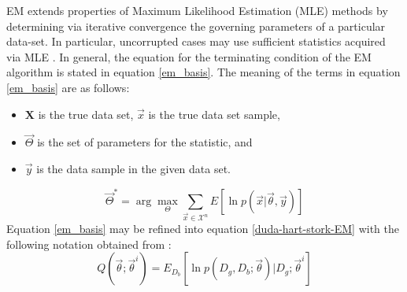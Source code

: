\documentclass[11pt]{article}
\begin{document}
EM extends properties of Maximum Likelihood Estimation (MLE) methods by determining via iterative convergence %
the governing parameters of a particular data-set.   In particular,  uncorrupted cases may use sufficient statistics acquired via MLE  \cite{duda-hart-stork}.  
In general, the equation for the terminating condition of the EM algorithm \cite{duda-hart-stork} is stated in equation \ref{em_basis}.  The meaning of the terms in equation \ref{em_basis} are as follows:
\begin{itemize}
\item  $\mathbf{X}$ is the true data set, $\vec{x}$ is the true data set sample, 
 \item $\vec{\Theta}$ is the set of parameters for the statistic, and 
 \item $\vec{y}$ is the data sample in the given data set.
 \end{itemize}
\begin{equation}
\vec{\Theta}^* = \arg \max_{\Theta} \sum_{\vec{x}\in \mathcal{X}^n} E[ \ln p( \vec{x} | \vec{\theta} ,\vec{y}) ] \label{em_basis}
\end{equation}
Equation \ref{em_basis} may be refined into equation \ref{duda-hart-stork-EM} with the following notation obtained from \cite{duda-hart-stork}:
\begin{equation}
Q( \vec{\theta} ; \vec{\theta}^i) = E_{D_b} [ \ln p(D_g, D_b; \vec{\theta}) | D_g ; \vec{\theta}^i ] \label{duda-hart-stork-EM}
\end{equation}
\end{document}
